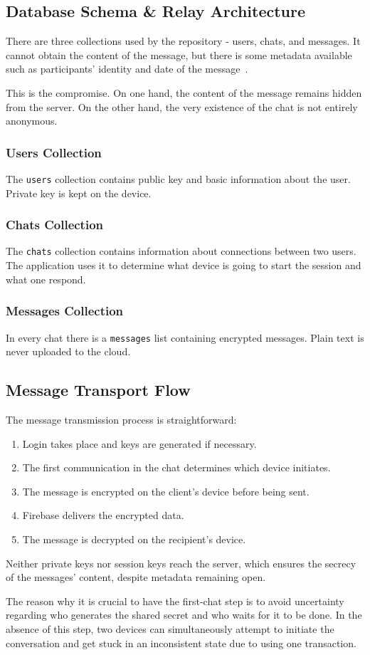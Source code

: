 \subsection{Database Schema \& Relay Architecture}
There are three collections used by the repository - users, chats, and messages. It cannot obtain the content of the message, but there is some metadata available such as participants' identity and date of the message~\cite{dolev_yao}.

This is the compromise. On one hand, the content of the message remains hidden from the server. On the other hand, the very existence of the chat is not entirely anonymous.

\subsubsection{Users Collection}
The \texttt{users} collection contains public key and basic information about the user. Private key is kept on the device.

\subsubsection{Chats Collection}
The \texttt{chats} collection contains information about connections between two users. The application uses it to determine what device is going to start the session and what one respond.

\subsubsection{Messages Collection}
In every chat there is a \texttt{messages} list containing encrypted messages. Plain text is never uploaded to the cloud.

\subsection{Message Transport Flow}
The message transmission process is straightforward:
\begin{enumerate}
    \item Login takes place and keys are generated if necessary.
    \item The first communication in the chat determines which device initiates.
    \item The message is encrypted on the client’s device before being sent.
    \item Firebase delivers the encrypted data.
    \item The message is decrypted on the recipient’s device.
\end{enumerate}
Neither private keys nor session keys reach the server, which ensures the secrecy of the messages’ content, despite metadata remaining open.

The reason why it is crucial to have the first-chat step is to avoid uncertainty regarding who generates the shared secret and who waits for it to be done. In the absence of this step, two devices can simultaneously attempt to initiate the conversation and get stuck in an inconsistent state due to using one transaction.
